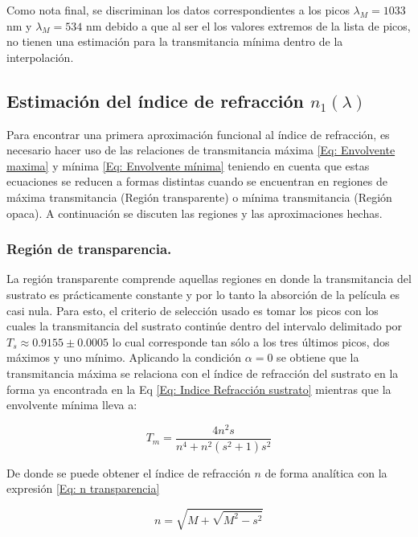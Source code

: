 \documentclass[article]{article}
\begin{document}
\begin{multicols}{2}
        Como nota final, se discriminan los datos correspondientes a los picos $\lambda_M=1033$ nm y $\lambda_M=534$ nm debido a que al ser el los valores extremos de la lista de picos, no tienen una estimación para la transmitancia mínima dentro de la interpolación.
        
        \subsection{Estimación del índice de refracción $n_1(\lambda)$}
        
        Para encontrar una primera aproximación funcional al índice de refracción, es necesario hacer uso de las relaciones de transmitancia máxima \ref{Eq: Envolvente maxima} y mínima \ref{Eq: Envolvente mínima} teniendo en cuenta que estas ecuaciones se reducen a formas distintas cuando se encuentran en regiones de máxima transmitancia (Región transparente) o mínima transmitancia (Región opaca). A continuación se discuten las regiones y las aproximaciones hechas.
        
        \subsubsection{Región de  transparencia.}
        
        La región transparente comprende aquellas regiones en donde la transmitancia del sustrato es prácticamente constante y por lo tanto la absorción de la película es casi nula. Para esto, el criterio de selección usado es tomar los picos con los cuales la transmitancia del sustrato continúe dentro del intervalo delimitado por $T_s\approx 0.9155 \pm 0.0005$ lo cual corresponde tan sólo a los tres últimos picos, dos máximos y uno mínimo. Aplicando la condición $\alpha=0$ se obtiene que la transmitancia máxima se relaciona con el índice de refracción del sustrato en la forma ya encontrada en la Eq \ref{Eq: Indice Refracción sustrato} mientras que la envolvente mínima lleva a:
        
        \begin{equation*}   T_m=\frac{4n^2s}{n^4+n^2(s^2+1)s^2}
        \end{equation*}
        
        De donde se puede obtener el índice de refracción $n$ de forma analítica con la expresión \ref{Eq: n transparencia} 
        
        \begin{equation}
            n=\sqrt{M+\sqrt{M^2-s^2}}
            \label{Eq: n transparencia}
        \end{equation}
        

\end{multicols}
\end{document}
